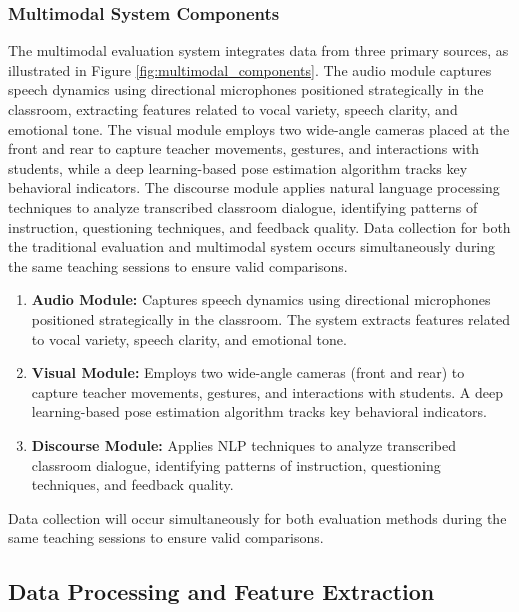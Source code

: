 \subsubsection{Multimodal System Components}
The multimodal evaluation system integrates data from three primary sources, as illustrated in Figure \ref{fig:multimodal_components}. The audio module captures speech dynamics using directional microphones positioned strategically in the classroom, extracting features related to vocal variety, speech clarity, and emotional tone. The visual module employs two wide-angle cameras placed at the front and rear to capture teacher movements, gestures, and interactions with students, while a deep learning-based pose estimation algorithm tracks key behavioral indicators. The discourse module applies natural language processing techniques to analyze transcribed classroom dialogue, identifying patterns of instruction, questioning techniques, and feedback quality. Data collection for both the traditional evaluation and multimodal system occurs simultaneously during the same teaching sessions to ensure valid comparisons.



\begin{enumerate}
    \item \textbf{Audio Module:} Captures speech dynamics using directional microphones positioned strategically in the classroom. The system extracts features related to vocal variety, speech clarity, and emotional tone.
    
    \item \textbf{Visual Module:} Employs two wide-angle cameras (front and rear) to capture teacher movements, gestures, and interactions with students. A deep learning-based pose estimation algorithm tracks key behavioral indicators.
    
    \item \textbf{Discourse Module:} Applies NLP techniques to analyze transcribed classroom dialogue, identifying patterns of instruction, questioning techniques, and feedback quality.
\end{enumerate}

Data collection will occur simultaneously for both evaluation methods during the same teaching sessions to ensure valid comparisons.


\subsection{Data Processing and Feature Extraction}

